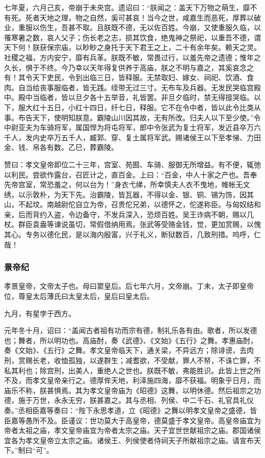 \documentclass[]{article}
\begin{document}
七年夏，六月己亥，帝崩于未央宫。遗诏曰：``朕闻之：盖天下万物之萌生，靡不有死。死者天地之理，物之自然，奚可甚哀！当今之世，咸嘉生而恶死，厚葬以破业，重服以伤生，吾甚不取。且朕既不德，无以佐百姓。今崩，又使重服久临，以罹寒暑之数，哀人父子；伤长老之志，损其饮食，绝鬼神之祭祀，以重吾不德，谓天下何！朕获保宗庙，以眇眇之身托于天下君王之上，二十有余年矣。赖天之灵。社稷之福，方内安宁，靡有兵革。朕既不敏，常畏过行，以羞先帝之遗德；惟年之久长，惧于不终。今乃幸以天年得复供养于高庙，朕之不明与嘉之，其奚哀念之有！其令天下吏民，令到出临三日，皆释服。无禁取妇、嫁女、祠祀、饮酒、食肉。自当给丧事服临者，皆无践。绖带无过三寸。无布车及兵器。无发民哭临宫殿中。殿中当临者，皆以旦夕各十五举音，礼皆罢。非旦夕临时，禁无得擅哭临。以下，服大红十五日，小红十四日，纤七日，释服。它不在令中者，皆以此令比类从事。布告天下，使明知朕意。霸陵山川因其故，无有所改。归夫人以下至少使。''令中尉亚夫为车骑将军，属国悍为将屯将军，郎中令张武为复士将军，发近县卒万六千人，发内史卒万五千人，臧郭、穿、复土属将军武。赐诸侯王以下至孝悌、力田金、钱、帛各有数。乙巳，葬霸陵。

赞曰：孝文皇帝即位二十三年，宫室、苑囿、车骑、服御无所增益。有不便，辄弛以利民。尝欲作露台，召匠计之，直百金。上曰：``百金，中人十家之产也。吾奉先帝宫室，常恐羞之，何以台为！''身衣弋绨，所幸慎夫人衣不曳地，帷帐无文绣，以示敦朴，为天下先。治霸陵，皆瓦器，不得以金、银、铜、锡为饰，因其山，不起坟。南越尉佗自立为帝，召贵佗兄弟，以德怀之，佗遂称臣。与匈奴结和亲，后而背约入盗，令边备守，不发兵深入，恐烦百姓。吴王诈病不朝，赐以几杖。群臣袁盎等谏说虽切，常假借纳用焉。张武等受赂金钱，觉，更加赏赐，以愧其心。专务以德化民，是以海内殷富，兴于礼义，断狱数百，几致刑措。呜呼，仁哉！

\hypertarget{header-n288}{%
\subsubsection{景帝纪}\label{header-n288}}

孝景皇帝，文帝太子也。母曰窦皇后。后七年六月，文帝崩。丁未，太子即皇帝位，尊皇太后薄氏曰太皇太后，皇后曰皇太后。

九月，有星孛于西方。

元年冬十月，诏曰：``盖闻古者祖有功而宗有德，制礼乐各有由。歌者，所以发德也；舞者，所以明功也。高庙酎，奏《武德》、《文始》《五行》之舞。孝惠庙酎，奏《文始》、《五行》之舞。孝文皇帝临天下，通关梁，不异远方；除诽谤，去肉刑，赏赐长老，收恤孤独，以遂群生；减耆欲，不受献，罪人不帑，不诛亡罪，不私其利也；除宫刑，出美人，重绝人之世也。朕既不敏，弗能胜识。此皆上世之所不及，而孝文皇帝亲行之。德厚侔天地，利泽施四海，靡不获福。明象乎日月，而庙乐不称，朕甚惧焉。其为孝文皇帝庙为《昭德》这舞，以明休德。然后祖宗之功德，施于万世，永永无穷，朕甚嘉之。其与丞相、列侯、中二千石、礼官具礼仪奏。''丞相臣嘉等奏曰：``陛下永思孝道，立《昭德》之舞以明孝文皇帝之盛德，皆臣嘉等愚所不及。臣谨议：世功莫大于高皇帝，德莫盛于孝文皇帝。高皇帝庙宜为帝者太祖之庙，孝文皇帝庙宜为帝者太宗之庙。天子宜世世献祖宗之庙。郡国诸侯宜各为孝文皇帝立太宗之庙。诸侯王、列侯使者侍祠天子所献祖宗之庙。请宣布天下。''制曰``可''。
\end{document}
